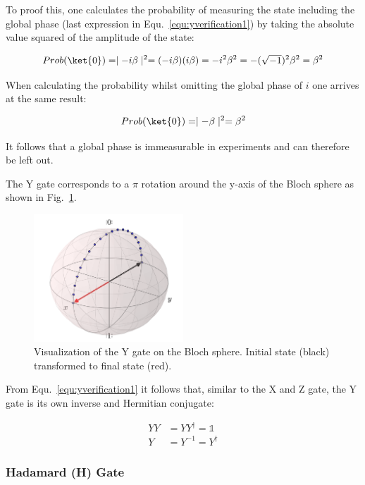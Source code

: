 To proof this, one calculates the probability of measuring the \0 state including the global phase (last expression in Equ.~\ref{equ:yverification1}) by taking the absolute value squared of the amplitude of the \0 state:

\begin{equation}
\label{equ:globalphase}
Prob(\ket{0}) = \mid-i\beta\mid^2 = (-i\beta)(i\beta) = -i^2\beta^2 = -(\sqrt{-1})^2\beta^2 = \beta^2
\end{equation}

When calculating the probability whilst omitting the global phase of $i$ one arrives at the same result: 

\begin{equation}
\label{equ:globalphase}
Prob(\ket{0}) = \mid-\beta\mid^2 = \beta^2
\end{equation}

It follows that a global phase is immeasurable in experiments and can therefore be left out.

The Y gate corresponds to a $\pi$ rotation around the y-axis of the Bloch sphere as shown in Fig.~\ref{img:blochygate}.

\begin{figure}[ht]
   \centering
   \includegraphics[width=0.5\textwidth]{img/blochygate.png}
   \caption{Visualization of the Y gate on the Bloch sphere. Initial state (black) transformed to final state (red).}
   \label{img:blochygate}
\end{figure}

From Equ.~\ref{equ:yverification1} it follows that, similar to the X and Z gate, the Y gate is its own inverse and Hermitian conjugate:

\begin{align}
YY &= YY^\dagger = \mathbb{1} \\
Y &= Y^{-1} = Y^\dagger
\end{align}


\subsubsection{Hadamard (H) Gate}
\label{subsubsubsec:hadamardgate}

